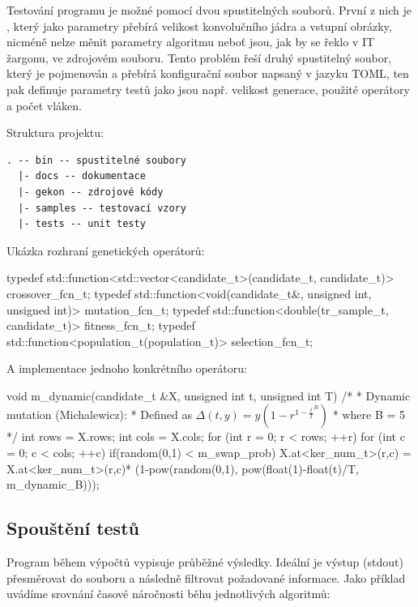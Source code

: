 \documentclass[a4paper,11pt,titlepage]{scrartcl}
\begin{document}
Testování programu je možné pomocí dvou spustitelných souborů. První z nich je , který jako parametry přebírá velikost konvolučního jádra a vstupní obrázky, nicméně nelze měnit parametry algoritmu neboť jsou, jak by se řeklo v IT žargonu,  ve zdrojovém souboru. Tento problém řeší druhý spustitelný soubor, který je pojmenován  a přebírá konfigurační soubor napsaný v jazyku TOML, ten pak definuje parametry testů jako jsou např. velikost generace, použité operátory a počet vláken.


Struktura projektu:
\begin{verbatim}
. -- bin -- spustitelné soubory
  |- docs -- dokumentace
  |- gekon -- zdrojové kódy
  |- samples -- testovací vzory
  |- tests -- unit testy
\end{verbatim}

Ukázka rozhraní genetických operátorů:
\begin{cppcode}
typedef std::function<std::vector<candidate_t>(candidate_t, candidate_t)> crossover_fcn_t;
typedef std::function<void(candidate_t&, unsigned int, unsigned int)> mutation_fcn_t;
typedef std::function<double(tr_sample_t, candidate_t)> fitness_fcn_t;
typedef std::function<population_t(population_t)> selection_fcn_t;
\end{cppcode}

A implementace jednoho konkrétního operátoru:
\begin{cppcode}
void m_dynamic(candidate_t &X, unsigned int t, unsigned int T) {
    /*
     * Dynamic mutation (Michalewicz):
     * Defined as $\Delta(t,y) = y \left( 1 - r^{ {1-\frac{t}{T} }^B }  \right)$
     *     where B = 5
     */
   int rows = X.rows;
   int cols = X.cols;
   for (int r = 0; r < rows; ++r) {
        for (int c = 0; c < cols; ++c) {
            if(random(0,1) < m_swap_prob) {
                X.at<ker_num_t>(r,c) = X.at<ker_num_t>(r,c)*
                (1-pow(random(0,1), pow(float(1)-float(t)/T, m_dynamic_B)));
            }
        }
    }
}

\end{cppcode}

\subsection{Spouštění testů}
Program během výpočtů vypisuje průběžné výsledky. Ideální je výstup (stdout) přesměrovat do souboru a následně filtrovat požadované informace. Jako příklad uvádíme srovnání časové náročnosti běhu jednotlivých algoritmů:
\end{document}
